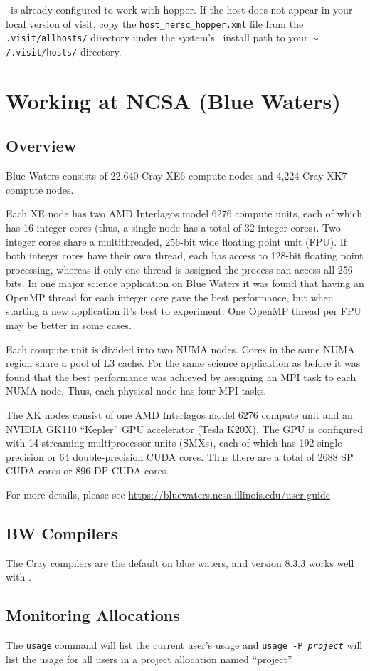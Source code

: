 \visit\ is already configured to work with hopper.  If the host does not appear
in your local version of visit, copy the {\tt host\_nersc\_hopper.xml} file
from the {\tt .visit/allhosts/} directory under the system's \visit\ install path
to your {\tt $\mathtt{\sim}$/.visit/hosts/} directory. 



\section{Working at NCSA (Blue Waters)}

\subsection{Overview}

Blue Waters consists of 22,640 Cray XE6 compute nodes and 4,224
Cray XK7 compute nodes.

Each XE node has two AMD Interlagos model 6276 compute units, each of
which has 16 integer cores (thus, a single node has a total of 32 integer
cores).  Two integer cores share a multithreaded, 256-bit wide floating 
point unit (FPU).  If both integer cores have their own thread, each has access 
to 128-bit floating point processing, whereas if only one thread is 
assigned the process can access all 256 bits.  In one major science
application on Blue Waters it was found that having an OpenMP thread for
each integer core gave the best performance, but when starting a new
application it's best to experiment.  One OpenMP thread per FPU may
be better in some cases.

Each compute unit is divided into two NUMA nodes.  Cores in
the same NUMA region share a pool of L3 cache.  For the same science
application as before it was found that the best performance was achieved
by assigning an MPI task to each NUMA node.  Thus, each physical node
has four MPI tasks.

The XK nodes consist of one AMD Interlagos model 6276 compute unit
and an NVIDIA GK110 ``Kepler'' GPU accelerator (Tesla K20X).  The
GPU is configured with 14 streaming multiprocessor units (SMXs), each
of which has 192 single-precision or 64 double-precision CUDA cores.  Thus
there are a total of 2688 SP CUDA cores or 896 DP CUDA cores.

For more details, please see 
\url{https://bluewaters.ncsa.illinois.edu/user-guide}

\subsection{BW Compilers}

The Cray compilers are the default on blue waters, and version
8.3.3 works well with \maestro.

\subsection{Monitoring Allocations}

The {\tt usage} command will list the current user's usage and 
{\tt usage -P {\em project}} will
list the usage for all users in a project allocation named ``project''.

